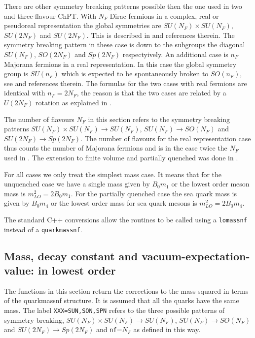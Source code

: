 \documentclass[12pt,a4paper]{article}
\newcommand{\mytt}[1]{\texttt{#1}}
\begin{document}
There are other symmetry breaking patterns possible then the one
used in two and three-flavour ChPT. With $N_F$ Dirac fermions in a complex,
real or pseudoreal representation the global symmetries are
$SU(N_F)\times SU(N_F)$, $SU(2N_F)$ and $SU(2N_F)$. This is
described in \cite{Bijnens:2009qm} and references therein. The symmetry
breaking pattern in these case is down to the subgroups
the diagonal $SU(N_F)$, $SO(2N_F)$ and $Sp(2N_F)$ respectyively.
An additional case is $n_F$ Majorana fermions in a real representation. 
In this case the global symmetry group is $SU(n_F)$ which is expected to be
spontaneously broken to $SO(n_F)$, see \cite{QCDliketemp} and references
therein. The formulas for the two cases with real fermions
are identical with $n_F=2N_F$, the reason is that the two cases are
related by a $U(2N_F)$ rotation as explained in \cite{QCDliketemp}.

The number of flavours $N_F$ in this section refers to the symmetry breaking
patterns $SU(N_F)\times SU(N_F)\to SU(N_F)$, $SU(N_F)\to SO(N_F)$
and $SU(2N_F)\to Sp(2N_F)$. The number of flavours for the real representation
case thus counts the number of Majorana fermions and is in the case twice
the $N_F$ used in \cite{Bijnens:2009qm}. The extension to finite volume
and partially quenched was done in \cite{QCDliketemp}.

For all cases we only treat the simplest mass case.
It means that for the unquenched case we have a single mass given by
$B_0 m_1$ or the lowest order meson mass is $m_{LO}^2= 2 B_0 m_1$.
For the partially quenched case the sea quark mass is given by
$B_0 m_4$ or the lowest order mass for sea quark mesons
is $m_{LO}^2=2 B_0 m_4$. 

The standard \textsc{C++} conversions allow the
routines to be called using a \mytt{lomassnf} instead of a \mytt{quarkmassnf}.


\subsection{Mass, decay constant and vacuum-expectation-value: in lowest order}

The functions in this section return the corrections
to the mass-squared in terms of the quarkmassnf structure. It is assumed that
all the quarks have the same mass.
The label \mytt{XXX=SUN,SON,SPN} refers to the three possible patterns
of symmetry breaking, $SU(N_F)\times SU(N_F)\to SU(N_F)$, $SU(N_F)\to SO(N_F)$
and $SU(2N_F)\to Sp(2N_F)$ and \mytt{nf}=$N_F$ as defined in this way.
\end{document}
